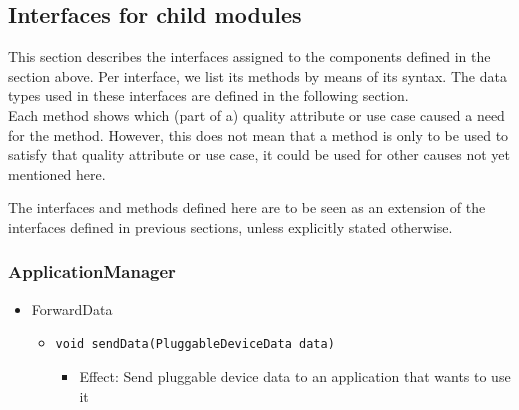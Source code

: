 \subsection{Interfaces for child modules}\label{add2-interfaces}
    This section describes the interfaces assigned to the components defined
    in the section above. Per interface, we list its methods by means of its
    syntax. The data types used in these interfaces are defined in the following section. \\

    \noindent Each method shows which (part of a) quality attribute or use case caused
    a need for the method. However, this does not mean that a method is
    only to be used to satisfy that quality  attribute or use case, it could
    be used for other causes not yet mentioned here.

    \noindent The interfaces and methods defined here are to be seen as an
    extension of the interfaces defined in previous sections, unless
    explicitly stated otherwise.

    \subsubsection{ApplicationManager}
        \begin{itemize}
            \item ForwardData
            \begin{itemize}
                \item \texttt{void sendData(PluggableDeviceData data)}
                \begin{itemize}
                    \item Effect: Send pluggable device data to an application that wants to use it
                \end{itemize}
            \end{itemize}
        \end{itemize}

